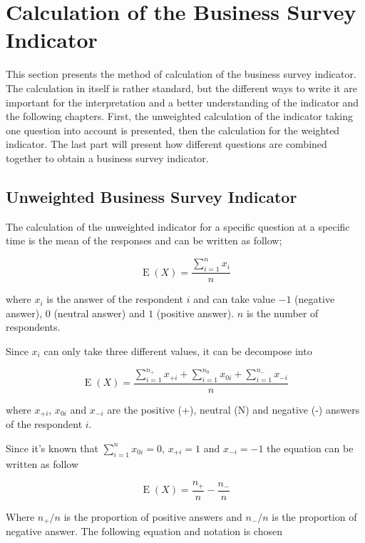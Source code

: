 \documentclass[12pt,a4paper,oneside]{book}
\DeclareMathOperator{\E}{E}
\begin{document}
\section{Calculation of the Business Survey Indicator}

This section presents the method of calculation of the business survey indicator.
The calculation in itself is rather standard, but the different ways to write it are important for the interpretation and a better understanding of the indicator and the following chapters.
First, the unweighted calculation of the indicator taking one question into account is presented, then the calculation for the weighted indicator. 
The last part will present how different questions are combined together to obtain a business survey indicator.


\subsection{Unweighted Business Survey Indicator}

The calculation of the unweighted indicator for a specific question at a specific time is the mean of the responses and can be written as follow;

\begin{equation}
    \E(X) = \frac{ \sum_{i=1}^n x_i}{n}
\end{equation} 

where 
$x_i$ is the answer of the respondent $i$ and can take value $-1$ (negative answer), $0$ (neutral answer) and $1$ (positive answer). 
$n$ is the number of respondents.

Since $x_i$ can only take three different values, it can be decompose into 

\begin{equation}
    \E(X) = \frac{ \sum_{i=1}^{n_+} x_{+i} + \sum_{i=1}^{n_0} x_{0i} + \sum_{i=1}^{n_-} x_{-i}}{n}
\end{equation} 


where 
$x_{+i}$, $x_{0i}$ and $x_{-i}$ are the positive (+), neutral (N) and negative (-) answers of the respondent $i$.

Since it's known that $\sum_{i=1}^n x_{0i} = 0$, $x_{+i} = 1$ and $x_{-i} = -1$ the equation can be written as follow

\begin{equation}
    \E(X) = \frac{n_+}{n}  - \frac{n_-}{n}
\end{equation} 

Where ${n_+}/{n}$ is the proportion of positive answers and ${n_-}/{n}$ is the proportion of negative answer. The following equation and notation is chosen
\end{document}
